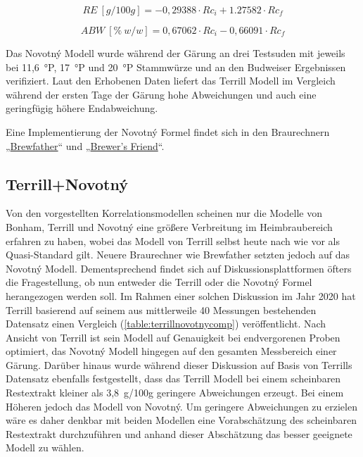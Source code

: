 \documentclass[a4paper,parskip=half]{scrartcl}
\newcommand{\bxic}{\mathit{Rc}_i}
\newcommand{\bxfc}{\mathit{Rc}_f}
\newcommand{\abw}{\mathit{ABW}}
\newcommand{\rex}{\mathit{RE}}
\begin{document}
\begin{equation}
\rex\:[g/100g] = -0,29388 \cdot \bxic + 1.27582 \cdot \bxfc
\label{eq:novotnyre}
\end{equation}

\begin{equation}
\abw\:[\%\:w/w] = 0,67062 \cdot \bxic - 0,66091 \cdot \bxfc
\label{eq:novotnyabw}
\end{equation}

Das Novotný Modell wurde während der Gärung an drei Testsuden mit jeweils
bei 11,6~°P, 17~°P und 20~°P Stammwürze und an den Budweiser
Ergebnissen verifiziert. Laut den Erhobenen Daten liefert das Terrill
Modell im Vergleich während der ersten Tage der Gärung hohe
Abweichungen und auch eine geringfügig höhere Endabweichung.
\autocite{Novotny2017a,Novotny2017}

Eine Implementierung der Novotný Formel findet sich in den Braurechnern
„\href{https://brewfather.app}{Brewfather}“ und
„\href{https://www.brewersfriend.com/refractometer-calculator}{Brewer's Friend}“.

\subsection*{Terrill+Novotný}

Von den vorgestellten Korrelationsmodellen scheinen nur die
Modelle von Bonham, Terrill und Novotný eine größere Verbreitung im Heimbraubereich erfahren zu haben, wobei das Modell von Terrill selbst
heute nach wie vor als Quasi-Standard gilt. Neuere Braurechner
wie Brewfather setzten jedoch auf das Novotný Modell. Dementsprechend
findet sich auf Diskussionsplattformen öfters die Fragestellung, ob nun
entweder die Terrill oder die Novotný Formel herangezogen werden
soll. Im Rahmen einer solchen Diskussion im Jahr 2020 hat Terrill
basierend auf seinem aus mittlerweile 40 Messungen bestehenden Datensatz
einen Vergleich (\autoref{table:terrillnovotnycomp}) veröffentlicht.
Nach Ansicht von Terrill ist sein Modell auf Genauigkeit bei endvergorenen
Proben optimiert, das Novotný Modell hingegen auf den gesamten
Messbereich einer Gärung. Darüber hinaus wurde während dieser Diskussion
auf Basis von Terrills Datensatz ebenfalls festgestellt, dass das
Terrill Modell bei einem scheinbaren Restextrakt kleiner als 3,8~g/100g 
geringere Abweichungen erzeugt. Bei einem Höheren jedoch das Modell von
Novotný. Um geringere Abweichungen zu erzielen wäre es daher denkbar mit
beiden Modellen eine Vorabschätzung des scheinbaren Restextrakt
durchzuführen und anhand dieser Abschätzung das besser geeignete Modell zu
wählen. \autocite{h22lude2020}
\end{document}
